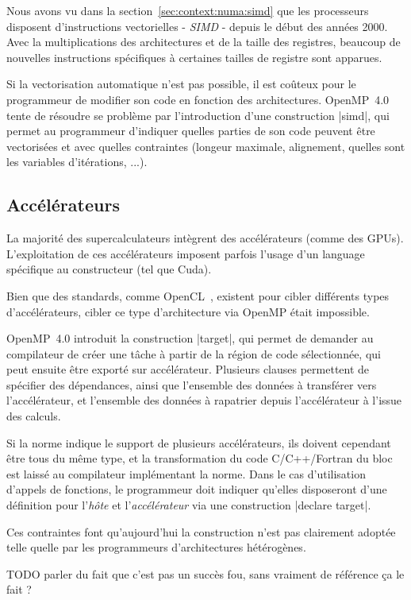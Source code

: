 Nous avons vu dans la section~\ref{sec:context:numa:simd} que les processeurs disposent d'instructions vectorielles - \emph{SIMD} - depuis le début des années 2000.
Avec la multiplications des architectures et de la taille des registres, beaucoup de nouvelles instructions spécifiques à certaines tailles de registre sont apparues.

Si la vectorisation automatique n'est pas possible, il est coûteux pour le programmeur de modifier son code en fonction des architectures.
OpenMP~4.0 tente de résoudre se problème par l'introduction d'une construction |simd|, qui permet au programmeur d'indiquer quelles parties de son code peuvent être vectorisées et avec quelles contraintes (longeur maximale, alignement, quelles sont les variables d'itérations, ...).


\subsection{Accélérateurs}

La majorité des supercalculateurs intègrent des accélérateurs (comme des GPUs).
L'exploitation de ces accélérateurs imposent parfois l'usage d'un language spécifique au constructeur (tel que Cuda).

Bien que des standards, comme OpenCL~\cite{Stone2010}, existent pour cibler différents types d'accélérateurs, cibler ce type d'architecture via OpenMP était impossible.

OpenMP~4.0 introduit la construction |target|, qui permet de demander au compilateur de créer une tâche à partir de la région de code sélectionnée, qui peut ensuite être exporté sur accélérateur.
Plusieurs clauses permettent de spécifier des dépendances, ainsi que l'ensemble des données à transférer vers l'accélérateur, et l'ensemble des données à rapatrier depuis l'accélérateur à l'issue des calculs.

Si la norme indique le support de plusieurs accélérateurs, ils doivent cependant être tous du même type, et la transformation du code C/C++/Fortran du bloc est laissé au compilateur implémentant la norme.
Dans le cas d'utilisation d'appels de fonctions, le programmeur doit indiquer qu'elles disposeront d'une définition pour l'\emph{hôte} et l'\emph{accélérateur} via une construction |declare target|.

Ces contraintes font qu'aujourd'hui la construction n'est pas clairement adoptée telle quelle par les programmeurs d'architectures hétérogènes.

TODO parler du fait que c'est pas un succès fou, sans vraiment de référence ça le fait ?

